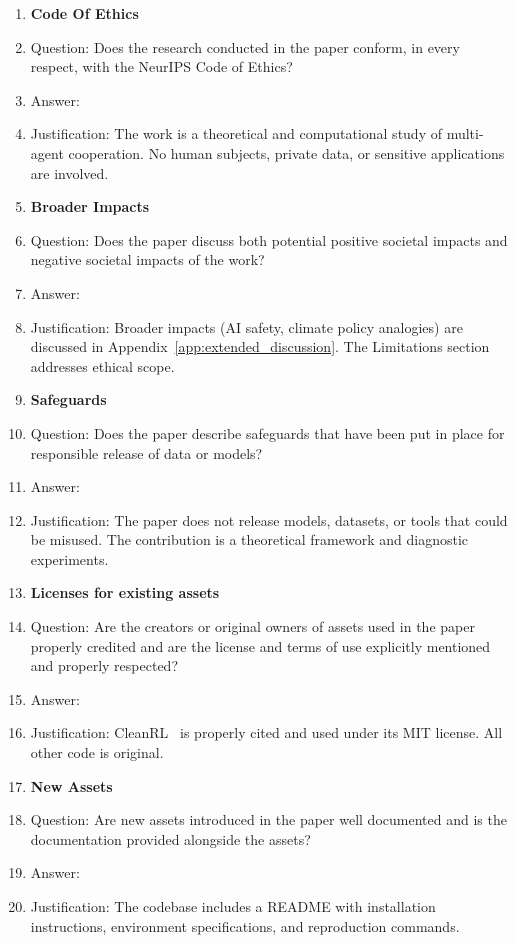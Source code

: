 \begin{enumerate}
\item {\bf Code Of Ethics}
    \item[] Question: Does the research conducted in the paper conform, in every respect, with the NeurIPS Code of Ethics?
    \item[] Answer: \answerYes{}
    \item[] Justification: The work is a theoretical and computational study of multi-agent cooperation. No human subjects, private data, or sensitive applications are involved.

\item {\bf Broader Impacts}
    \item[] Question: Does the paper discuss both potential positive societal impacts and negative societal impacts of the work?
    \item[] Answer: \answerYes{}
    \item[] Justification: Broader impacts (AI safety, climate policy analogies) are discussed in Appendix~\ref{app:extended_discussion}. The Limitations section addresses ethical scope.

\item {\bf Safeguards}
    \item[] Question: Does the paper describe safeguards that have been put in place for responsible release of data or models?
    \item[] Answer: \answerNA{}
    \item[] Justification: The paper does not release models, datasets, or tools that could be misused. The contribution is a theoretical framework and diagnostic experiments.

\item {\bf Licenses for existing assets}
    \item[] Question: Are the creators or original owners of assets used in the paper properly credited and are the license and terms of use explicitly mentioned and properly respected?
    \item[] Answer: \answerYes{}
    \item[] Justification: CleanRL~\citep{huang2022cleanrl} is properly cited and used under its MIT license. All other code is original.

\item {\bf New Assets}
    \item[] Question: Are new assets introduced in the paper well documented and is the documentation provided alongside the assets?
    \item[] Answer: \answerYes{}
    \item[] Justification: The codebase includes a README with installation instructions, environment specifications, and reproduction commands.


\end{enumerate}
